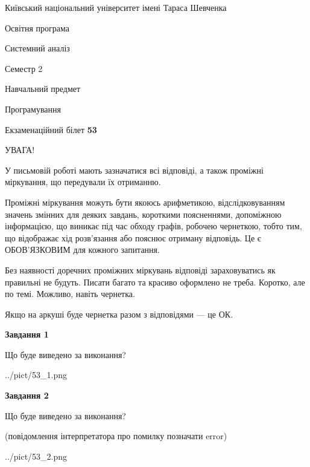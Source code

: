 \documentclass[12pt, ukrainian]{article}
\begin{document}
{{\begin {small}\par
{ \center  Київський національний університет імені Тараса Шевченка \par}
{\parbox {5 cm}{Освітня програма \hfill}{\parbox {7 cm}{Системний аналіз \hfill}}\parbox {6 cm}{\hfill Семестр 2}}\par
{\parbox {5 cm} {Навчальний предмет \hfill}\parbox {7 cm}{Програмування \hfill}\parbox {6cm}{\hfill}\par}\vspace{-7pt} \end{small}}{\center Екзаменаційний білет \No \textbf
{ 53 }\par}}
{
\begin {large}
УВАГА!

У письмовій роботі мають зазначатися всі відповіді, а також проміжні міркування, що передували їх отриманню.

Проміжні міркування можуть бути якоюсь арифметикою, відслідковуванням зна\-чень змінних для деяких завдань,
короткими поясненнями, допоміжною інформацією, що виникає під час обходу графів, робочею чернеткою,
тобто тим, що відображає хід розв’язання або пояснює отриману відповідь.
Це є ОБОВ’ЯЗКОВИМ для кожного запитання.

Без наявності доречних проміжних міркувань відповіді зараховуватись як правиль\-ні не будуть.
Писати багато та красиво оформлено не треба. Коротко, але по темі. Можли\-во, навіть чернетка.

Якщо на аркуші буде чернетка разом з відповідями --- це ОК.

\newpage

{\begin {center}\textbf{Завдання 1}\end {center}}\par
Що буде виведено за виконання?\par
\begin{center}
	{../pict/53_1.png}
\end{center}
\newpage

{\begin {center}\textbf{Завдання 2}\end {center}}\par
Що буде виведено за виконання?\par
 (повідомлення інтерпретатора про помилку позначати error)\par
\begin{center}
	{../pict/53_2.png}
\end{center}
\newpage


\end{large}}
\end{document}
